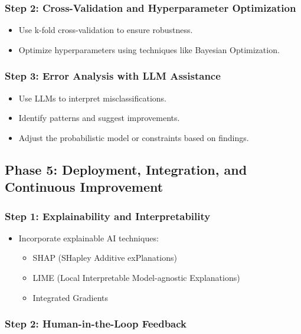 \documentclass[12pt, a4paper]{article}
\begin{document}
\subsubsection{Step 2: Cross-Validation and Hyperparameter Optimization}

\begin{itemize}
    \item Use k-fold cross-validation to ensure robustness.
    \item Optimize hyperparameters using techniques like Bayesian Optimization.
\end{itemize}

\subsubsection{Step 3: Error Analysis with LLM Assistance}

\begin{itemize}
    \item Use LLMs to interpret misclassifications.
    \item Identify patterns and suggest improvements.
    \item Adjust the probabilistic model or constraints based on findings.
\end{itemize}

\subsection{Phase 5: Deployment, Integration, and Continuous Improvement}

\subsubsection{Step 1: Explainability and Interpretability}

\begin{itemize}
    \item Incorporate explainable AI techniques:
    \begin{itemize}
        \item SHAP (SHapley Additive exPlanations)
        \item LIME (Local Interpretable Model-agnostic Explanations)
        \item Integrated Gradients
    \end{itemize}
\end{itemize}

\subsubsection{Step 2: Human-in-the-Loop Feedback}
\end{document}
